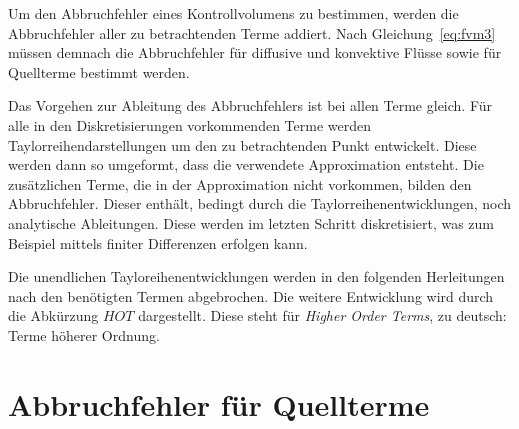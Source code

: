 Um den Abbruchfehler eines Kontrollvolumens zu bestimmen, werden die
Abbruchfehler aller zu betrachtenden Terme addiert. Nach Gleichung~\ref{eq:fvm3}
müssen demnach die Abbruchfehler für diffusive und konvektive Flüsse sowie
für Quellterme bestimmt werden.

Das Vorgehen zur Ableitung des Abbruchfehlers ist bei allen Terme gleich.
Für alle in den Diskretisierungen vorkommenden Terme werden Taylorreihendarstellungen
um den zu betrachtenden Punkt entwickelt. Diese werden dann so umgeformt, dass die
verwendete Approximation entsteht. Die zusätzlichen Terme, die in der Approximation nicht
vorkommen, bilden den Abbruchfehler. Dieser enthält, bedingt durch die Taylorreihenentwicklungen,
noch analytische Ableitungen. Diese werden im letzten Schritt diskretisiert, was zum Beispiel
mittels finiter Differenzen erfolgen kann.

Die unendlichen Tayloreihenentwicklungen werden in den folgenden Herleitungen nach den benötigten
Termen abgebrochen. Die weitere Entwicklung wird durch die Abkürzung $HOT$ dargestellt.
Diese steht für \emph{Higher Order Terms}, zu deutsch: Terme höherer Ordnung.

\section{Abbruchfehler für Quellterme}
\label{sec:Quellterm}

